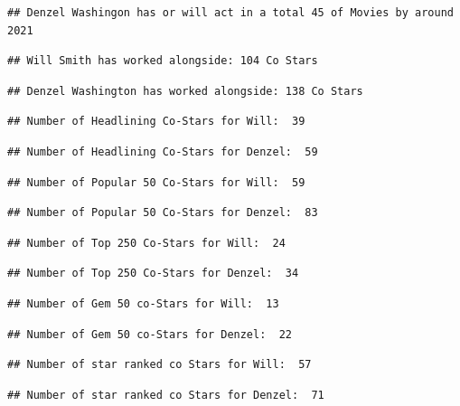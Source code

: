 \documentclass[]{article}
\begin{document}
\begin{verbatim}
## Denzel Washingon has or will act in a total 45 of Movies by around 2021
\end{verbatim}

\begin{verbatim}
## Will Smith has worked alongside: 104 Co Stars
\end{verbatim}

\begin{verbatim}
## Denzel Washington has worked alongside: 138 Co Stars
\end{verbatim}

\begin{verbatim}
## Number of Headlining Co-Stars for Will:  39
\end{verbatim}

\begin{verbatim}
## Number of Headlining Co-Stars for Denzel:  59
\end{verbatim}

\begin{verbatim}
## Number of Popular 50 Co-Stars for Will:  59
\end{verbatim}

\begin{verbatim}
## Number of Popular 50 Co-Stars for Denzel:  83
\end{verbatim}

\begin{verbatim}
## Number of Top 250 Co-Stars for Will:  24
\end{verbatim}

\begin{verbatim}
## Number of Top 250 Co-Stars for Denzel:  34
\end{verbatim}

\begin{verbatim}
## Number of Gem 50 co-Stars for Will:  13
\end{verbatim}

\begin{verbatim}
## Number of Gem 50 co-Stars for Denzel:  22
\end{verbatim}

\begin{verbatim}
## Number of star ranked co Stars for Will:  57
\end{verbatim}

\begin{verbatim}
## Number of star ranked co Stars for Denzel:  71
\end{verbatim}
\end{document}
